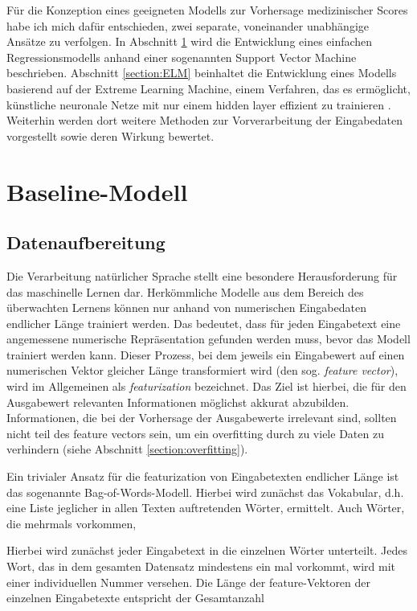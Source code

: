 Für die Konzeption eines geeigneten Modells zur Vorhersage medizinischer Scores habe ich mich dafür entschieden, zwei separate, voneinander unabhängige Ansätze zu verfolgen. In Abschnitt \ref{section:baseline} wird die Entwicklung eines einfachen Regressionsmodells anhand einer sogenannten Support Vector Machine beschrieben. Abschnitt \ref{section:ELM} beinhaltet die Entwicklung eines Modells basierend auf der Extreme Learning Machine, einem Verfahren, das es ermöglicht, künstliche neuronale Netze mit nur einem hidden layer effizient zu trainieren \citep{huangExtremeLearningMachine2006}. Weiterhin werden dort weitere Methoden zur Vorverarbeitung der Eingabedaten vorgestellt sowie deren Wirkung bewertet. 

\section{Baseline-Modell}\label{section:baseline}

\subsection{Datenaufbereitung}

Die Verarbeitung natürlicher Sprache stellt eine besondere Herausforderung für das maschinelle Lernen dar. Herkömmliche Modelle aus dem Bereich des überwachten Lernens können nur anhand von numerischen Eingabedaten endlicher Länge trainiert werden.
Das bedeutet, dass für jeden Eingabetext eine angemessene numerische Repräsentation gefunden werden muss, bevor das Modell trainiert werden kann. Dieser Prozess, bei dem jeweils ein Eingabewert auf einen numerischen Vektor gleicher Länge transformiert wird (den sog. \textit{feature vector}), wird im Allgemeinen als \textit{featurization} bezeichnet. Das Ziel ist hierbei, die für den Ausgabewert relevanten Informationen möglichst akkurat abzubilden. Informationen, die bei der Vorhersage der Ausgabewerte irrelevant sind, sollten nicht teil des feature vectors sein, um ein overfitting durch zu viele Daten zu verhindern (siehe Abschnitt \ref{section:overfitting}).

Ein trivialer Ansatz für die featurization von Eingabetexten endlicher Länge ist das sogenannte Bag-of-Words-Modell. Hierbei wird zunächst das Vokabular, d.h. eine Liste jeglicher in allen Texten auftretenden Wörter, ermittelt. Auch Wörter, die mehrmals vorkommen, 

Hierbei wird zunächst jeder Eingabetext in die einzelnen Wörter unterteilt. Jedes Wort, das in dem gesamten Datensatz mindestens ein mal vorkommt, wird mit einer individuellen Nummer versehen. Die Länge der feature-Vektoren der einzelnen Eingabetexte entspricht der Gesamtanzahl

